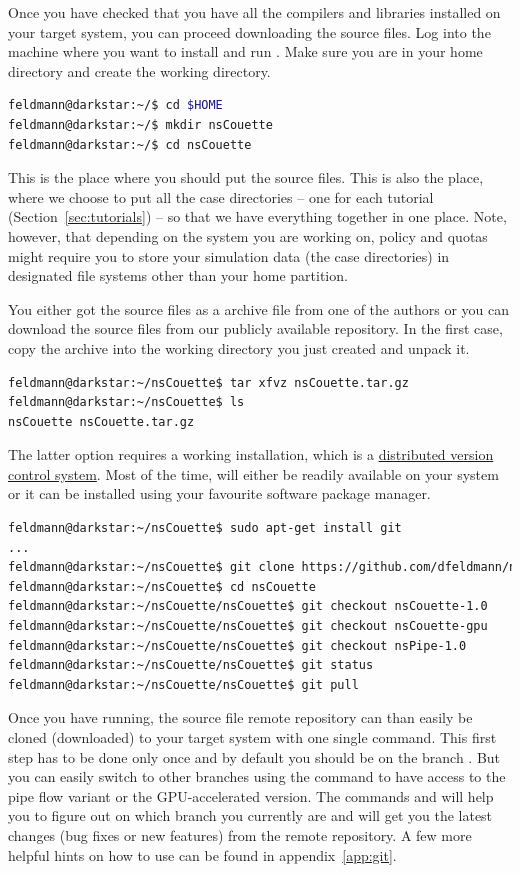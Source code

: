 \documentclass[a4paper, 11pt, DIV=11]{scrartcl}
\begin{document}
Once you have checked that you have all the compilers and libraries installed
on your target system, you can proceed downloading the \nsc source files. Log
into the machine where you want to install and run \nsc. Make sure you are in
your home directory and create the \nsc working directory.
\begin{lstlisting}[language=bash]
feldmann@darkstar:~/$ cd $HOME
feldmann@darkstar:~/$ mkdir nsCouette
feldmann@darkstar:~/$ cd nsCouette
\end{lstlisting}
This is the place where you should put the source files. This is also the place,
where we choose to put all the case directories -- one for each tutorial
(Section~\ref{sec:tutorials}) -- so that we have everything together in one place. Note,
however, that depending on the system you are working on, policy and quotas might
require you to store your simulation data (\ie the case directories) in
designated file systems other than your home partition.
\par
You either got the source files as a  archive file from one of the
authors or you can download the source files from our publicly available
\href{https://github.com/dfeldmann/nsCoutte}{} repository.
In the first case, copy the archive into the working directory you just created
and unpack it.
\begin{lstlisting}[language=bash]
feldmann@darkstar:~/nsCouette$ tar xfvz nsCouette.tar.gz
feldmann@darkstar:~/nsCouette$ ls
nsCouette nsCouette.tar.gz
\end{lstlisting}
The latter option requires a working  installation, which is a
\href{https://git-scm.com/}{distributed version control system}. Most of
the time,  will either be readily available on your system or
it can be installed using your favourite software package manager.
\begin{lstlisting}[language=bash]
feldmann@darkstar:~/nsCouette$ sudo apt-get install git
...
feldmann@darkstar:~/nsCouette$ git clone https://github.com/dfeldmann/nsCouette.git
feldmann@darkstar:~/nsCouette$ cd nsCouette
feldmann@darkstar:~/nsCouette/nsCouette$ git checkout nsCouette-1.0
feldmann@darkstar:~/nsCouette/nsCouette$ git checkout nsCouette-gpu
feldmann@darkstar:~/nsCouette/nsCouette$ git checkout nsPipe-1.0
feldmann@darkstar:~/nsCouette/nsCouette$ git status
feldmann@darkstar:~/nsCouette/nsCouette$ git pull
\end{lstlisting}
Once you have  running, the \nsc source file remote
repository can than easily be cloned (downloaded) to your target
system with one single command. This first step has to be done
only once and by default you should be on the branch .
But you can easily switch to other branches using the
 command to have access to the pipe flow variant
or the GPU-accelerated \cuda version. The
 commands  and  will help you
to figure out on which branch you currently are and will get you
the latest changes (\eg bug fixes or new features) from the remote
repository. A few more helpful hints on how to use  can
be found in appendix~\ref{app:git}.
\end{document}
